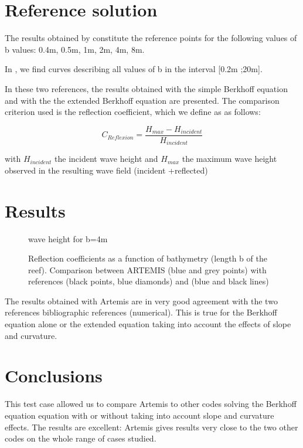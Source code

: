\section{Reference solution}

The results obtained by \cite{Massel1993} constitute the reference points for the following values of b
values: 0.4m, 0.5m, 1m, 2m, 4m, 8m.

In \cite{Michel1999}, we find curves describing all values of b in the interval [0.2m ;20m].

In these two references, the results obtained with the simple Berkhoff equation and with the
the extended Berkhoff equation are presented.
The comparison criterion used is the reflection coefficient, which we define as
as follows:

$$
C_{Reflexion}=\frac{H_{max}-H_{incident}}{H_{incident}}
$$

with $H_{incident}$ the incident wave height and
$H_{max}$ the maximum wave height observed in the resulting wave field (incident
+reflected)


\section{Results}

\begin{figure}[h]
\begin{center}
\end{center}
\caption{wave height for b=4m}
\label{fig:recif_resu_hm0}
\end{figure}

\begin{figure}[h]
\begin{center}
\end{center}
\caption{Reflection coefficients as a function of bathymetry (length b of the reef).
  Comparison between ARTEMIS (blue and grey points) with references \cite{Michel1999}
  (black points, blue diamonds) and \cite{Massel1993} (blue and black lines)}
\label{fig:recif_resu_reflec}
\end{figure}

The results obtained with Artemis are in very good agreement with the two references
bibliographic references (numerical). This is true for the Berkhoff equation alone or the extended equation
taking into account the effects of slope and curvature.

\section{Conclusions}

This test case allowed us to compare Artemis to other codes solving the Berkhoff equation
equation with or without taking into account slope and curvature effects. The results are excellent:
Artemis gives results very close to the two other codes on the whole range of cases
studied.
